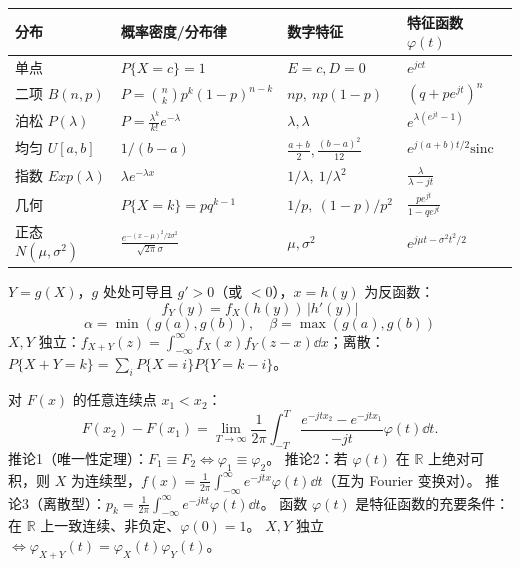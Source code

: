 \documentclass[UTF8,12pt,a4paper]{ctexart}
\begin{document}
\begin{center}\footnotesize
\begin{tabular}{p{1.34cm}p{2.42cm}p{2.66cm}p{2.06cm}}\hline
分布 & 概率密度/分布律 & 数字特征 & 特征函数 $\varphi(t)$\\\hline
单点 & $P\{X=c\}=1$ & $E=c,D=0$ & $e^{jct}$\\
二项 $B(n,p)$ & $P=\binom nkp^k(1-p)^{n-k}$ & $np,\ np(1-p)$ & $(q+pe^{jt})^n$\\
泊松 $P(\lambda)$ & $P=\frac{\lambda^k}{k!}e^{-\lambda}$ & $\lambda,\lambda$ & $e^{\lambda(e^{jt}-1)}$\\
均匀 $U[a,b]$ & $1/(b-a)$ & $\frac{a+b}2,\frac{(b-a)^2}{12}$ & $e^{j(a+b)t/2}\mathrm{sinc}$\\
指数 $Exp(\lambda)$ & $\lambda e^{-\lambda x}$ & $1/\lambda,\ 1/\lambda^2$ & $\frac{\lambda}{\lambda-jt}$\\
几何 & $P\{X=k\}=pq^{k-1}$ & $1/p,\ (1-p)/p^2$ & $\frac{pe^{jt}}{1-qe^{jt}}$\\
正态 $N(\mu,\sigma^2)$ & $\frac{e^{-(x-\mu)^2/2\sigma^2}}{\sqrt{2\pi}\sigma}$ & $\mu,\sigma^2$ & $e^{j\mu t-\sigma^2t^2/2}$\\\hline
\end{tabular}\end{center}
 $Y=g(X)$，$g$ 处处可导且 $g'>0$（或 $<0$），$x=h(y)$ 为反函数：
$$f_Y(y)=f_X(h(y))\,|h'(y)|$$
$$\alpha=\min(g(a),g(b)),\quad \beta=\max(g(a),g(b))$$
 $X,Y$ 独立：$f_{X+Y}(z)=\displaystyle\int_{-\infty}^{\infty}f_X(x)f_Y(z-x)\dd x$；离散：$P\{X+Y=k\}=\sum_iP\{X=i\}P\{Y=k-i\}$。

 对 $F(x)$ 的任意连续点 $x_1<x_2$：
$$F(x_2)-F(x_1)=\lim_{T\to\infty}\frac1{2\pi}\int_{-T}^{T}\frac{e^{-jtx_2}-e^{-jtx_1}}{-jt}\varphi(t)\dd t.$$
推论1（唯一性定理）：$F_1\equiv F_2\iff\varphi_1\equiv\varphi_2$。
推论2：若 $\varphi(t)$ 在 $\mathbb R$ 上绝对可积，则 $X$ 为连续型，$f(x)=\frac1{2\pi}\int_{-\infty}^{\infty}e^{-jtx}\varphi(t)\dd t$（互为 Fourier 变换对）。
推论3（离散型）：$p_k=\frac1{2\pi}\int_{-\infty}^{\infty}e^{-jkt}\varphi(t)\dd t$。
 函数 $\varphi(t)$ 是特征函数的充要条件：在 $\mathbb R$ 上一致连续、非负定、$\varphi(0)=1$。
 $X,Y$ 独立 $\iff\varphi_{X+Y}(t)=\varphi_X(t)\varphi_Y(t)$。
\end{document}
